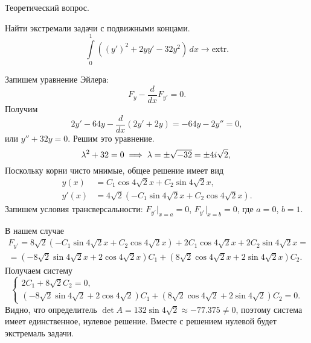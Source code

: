 \begin{problem}
Теоретический вопрос.
\end{problem}

\begin{problem}
 Найти экстремали задачи с подвижными концами.  
 \[
   \int\limits_{0}^{1} ((y')^2 + 2yy' - 32y^2)\,dx \to \mathrm{extr}.
 \]
 
\begin{solution}
  Запишем уравнение Эйлера:  
  \[
    F_y - \frac{d}{dx} F_{y'} = 0.
  \]
 Получим  
 \[
     2y' - 64y - \frac{d}{dx}(2y' + 2y) = - 64y - 2y'' = 0,
 \]
 или $ y'' + 32y = 0 $. Решим это уравнение.  
 \[
   \lambda^2 + 32 = 0 \implies \lambda = \pm\sqrt{-32} = \pm 4i\sqrt{2},\\
 \]
 Поскольку корни чисто мнимые, общее решение имеет вид  
 \begin{align*}
   y(x) &= C_1 \cos 4\sqrt{2}x + C_2 \sin 4\sqrt{2}x,\\
   y'(x) &= 4\sqrt2(-C_1\sin4\sqrt2 x + C_2\cos4\sqrt2 x).
 \end{align*}
 Запишем условия трансверсальности: $ F_{y'} \big|_{x=a} = 0 $, $ F_{y'}\big|_{x=b}=0 $,
 где $ a = 0 $, $ b = 1 $.

 В нашем случае
 \begin{multline*}
   F_{y'} = 8\sqrt{2}(-C_1\sin4\sqrt2 x + C_2 \cos4\sqrt2 x) + 2C_1\cos 4\sqrt2
   x + 2C_2 \sin4\sqrt2 x = \\ =
   (-8\sqrt2\sin4\sqrt2 x + 2\cos4\sqrt2 x)C_1 + (8\sqrt2 \cos 4\sqrt2 x +
   2\sin4\sqrt2 x) C_2.
 \end{multline*}
Получаем систему
\[
    \begin{cases}
      2C_1 + 8\sqrt2 C_2 = 0, \\
   (-8\sqrt2\sin4\sqrt2  + 2\cos4\sqrt2 )C_1 + (8\sqrt2 \cos 4\sqrt2  +
   2\sin4\sqrt2 ) C_2 = 0.
    \end{cases}
\]
Видно, что определитель $ \det A = 132 \sin4 \sqrt{2} \approx
  -77.375 \neq 0 $, поэтому система имеет единственное, нулевое решение. Вместе
  с решением нулевой будет экстремаль задачи.
\end{solution}
\end{problem}

